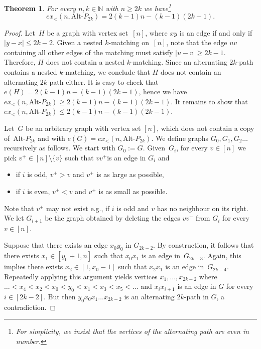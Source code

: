 \documentclass[11pt]{article}
\newtheorem{theorem}{Theorem}[section]
\theoremstyle{definition}
\def\marrow{{\marginpar[\hfill$\longrightarrow$]{$\longleftarrow$}}}
\def\janos#1{{\sc J\'anos says: }{\marrow\sf #1}}
\begin{document}
\begin{theorem}\label{thm:altpath}
For every $n,k\in\mathbb N$ with $n\ge 2k$ we have\footnote{For simplicity, we insist that the vertices of the alternating path are even in number.}
$$ex_<(n,\text{Alt-}P_{2k})=2(k-1)n-(k-1)(2k-1).$$    
\end{theorem}
\begin{proof}
Let~$H$ be a graph with vertex set~$[n]$, where $xy$ is an edge if and only if $|y-x|\le2k-2$.
Given a nested $k$-matching on~$[n]$, note that the edge $uv$ containing all other edges of the matching must satisfy $|u-v|\ge2k-1$.
Therefore, $H$ does not contain a nested $k$-matching.
Since an alternating $2k$-path contains a nested $k$-matching, we conclude that $H$ does not contain an alternating $2k$-path either.
It is easy to check that $e(H)=2(k-1)n-(k-1)(2k-1)$,
hence we have $ex_<(n,\text{Alt-}P_{2k})\ge 2(k-1)n-(k-1)(2k-1)$.
It remains to show that $ex_<(n,\text{Alt-}P_{2k})\le2(k-1)n-(k-1)(2k-1)$.

Let~$G$ be an arbitrary graph with vertex set $[n]$, which does not contain a copy of~$\text{Alt-}P_{2k}$ and with $e(G)=ex_<(n,\text{Alt-}P_{2k})$.
We define graphs $G_0,G_1,G_2\dots$ recursively  as follows.
We start with $G_0:=G$.
Given~$G_{i}$, for every $v\in[n]$ we pick $v^+\in[n]\setminus\{v\}$ such that $vv^+$is an edge in $G_i$ and
\begin{itemize}
    \item if $i$ is odd, $v^+>v$ and $v^+$ is as large as possible, 
    \item if $i$ is even, $v^+<v$ and $v^+$ is as small as possible.
\end{itemize}
Note that $v^+$ may not exist e.g., if $i$ is odd and $v$ has no neighbour on its right.
We let $G_{i+1}$ be the graph obtained by deleting the edges $vv^+$ from $G_i$ for every $v\in[n]$. %

Suppose that there exists an edge $x_0y_0$ in $G_{2k-2}$.
By construction, it follows that there exists $x_1\in[y_0+1,n]$ such that $x_0x_1$ is an edge in~$G_{2k-3}$.
Again, this implies there exists $x_2\in[1,x_0-1]$ such that $x_2x_1$ is an edge in~$G_{2k-4}$.
Repeatedly applying this argument yields vertices $x_1,\dots,x_{2k-2}$ where $\dots<x_4<x_2<x_0<y_0<x_1<x_3<x_5<\dots$ and $x_ix_{i+1}$ is an edge in $G$ for every $i\in[2k-2]$.
But then $y_0x_0x_1\dots x_{2k-2}$ is an alternating $2k$-path in $G$, a contradiction.


\end{proof}
\end{document}
